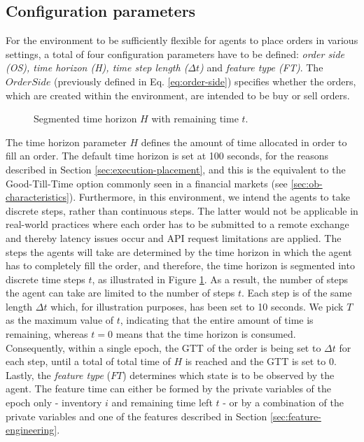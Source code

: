 \subsection{Configuration parameters}
\label{setup:parameters}
For the environment to be sufficiently flexible for agents to place orders in various settings, a total of four configuration parameters have to be defined: \textit{order side (OS), time horizon (H), time step length ($\Delta{t}$)} and \textit{feature type (FT)}.
The $OrderSide$ (previously defined in Eq. \ref{eq:order-side}) specifies whether the orders, which are created within the environment, are intended to be buy or sell orders.
\begin{figure}[H]
    \centering
    \caption{Segmented time horizon $H$ with remaining time $t$.}
    \label{fig:setup-time-horizon}
\end{figure}
The time horizon parameter $H$ defines the amount of time allocated in order to fill an order.
The default time horizon is set at 100 seconds, for the reasons described in Section \ref{sec:execution-placement}, and this is the equivalent to the Good-Till-Time option commonly seen in a financial markets (see \ref{sec:ob-characteristics}).
Furthermore, in this environment, we intend the agents to take discrete steps, rather than continuous steps.
The latter would not be applicable in real-world practices where each order has to be submitted to a remote exchange and thereby latency issues occur and API request limitations are applied.
The steps the agents will take are determined by the time horizon in which the agent has to completely fill the order, and therefore, the time horizon is segmented into discrete time steps $t$, as illustrated in Figure \ref{fig:setup-time-horizon}. 
As a result, the number of steps the agent can take are limited to the number of steps $t$.
Each step is of the same length $\Delta{t}$ which, for illustration purposes, has been set to 10 seconds.
We pick $T$ as the maximum value of $t$, indicating that the entire amount of time is remaining, whereas $t=0$ means that the time horizon is consumed.
Consequently, within a single epoch, the GTT of the order is being set to $\Delta{t}$ for each step, until a total of total time of $H$ is reached and the GTT is set to 0.
Lastly, the \textit{feature type} ($FT$) determines which state is to be observed by the agent.
The feature time can either be formed by the private variables of the epoch only - inventory $i$ and remaining time left $t$ - or by a combination of the private variables and one of the features described in Section \ref{sec:feature-engineering}.

